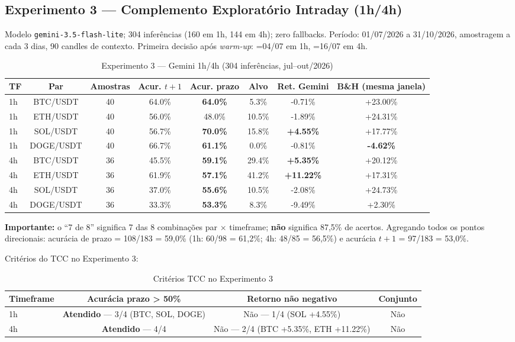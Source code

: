 \documentclass[conference]{IEEEtran}
\begin{document}
\subsection{Experimento 3 — Complemento Exploratório Intraday (1h/4h)}

Modelo \texttt{gemini-3.5-flash-lite}; 304 inferências (160 em 1h, 144 em 4h); zero fallbacks. Período: 01/07/2026 a 31/10/2026, amostragem a cada 3 dias, 90 candles de contexto. Primeira decisão após \textit{warm-up}: =04/07 em 1h, =16/07 em 4h.

\begin{table}[t]
  \centering
  \caption{Experimento 3 — Gemini 1h/4h (304 inferências, jul–out/2026)}
  \label{tab:exp3_intraday}
  \small
  \begin{tabular}{lccccccc}
    \toprule
    TF & Par & Amostras & Acur. $t+1$ & Acur. prazo & Alvo & Ret. Gemini & B\&H (mesma janela) \\
    \midrule
    1h & BTC/USDT & 40 & 64.0\% & \textbf{64.0\%} & 5.3\%  & -0.71\% & +23.00\% \\
    1h & ETH/USDT & 40 & 56.0\% & 48.0\% & 10.5\% & -1.89\% & +24.31\% \\
    1h & SOL/USDT & 40 & 56.7\% & \textbf{70.0\%} & 15.8\% & \textbf{+4.55\%} & +17.77\% \\
    1h & DOGE/USDT& 40 & 66.7\% & \textbf{61.1\%} & 0.0\%  & -0.81\% & \textbf{-4.62\%} \\
    4h & BTC/USDT & 36 & 45.5\% & \textbf{59.1\%} & 29.4\% & \textbf{+5.35\%} & +20.12\% \\
    4h & ETH/USDT & 36 & 61.9\% & \textbf{57.1\%} & 41.2\% & \textbf{+11.22\%} & +17.31\% \\
    4h & SOL/USDT & 36 & 37.0\% & \textbf{55.6\%} & 10.5\% & -2.08\%  & +24.73\% \\
    4h & DOGE/USDT& 36 & 33.3\% & \textbf{53.3\%} & 8.3\%  & -9.49\%  & +2.30\%  \\
    \bottomrule
  \end{tabular}
\end{table}

\textbf{Importante:} o ``7 de 8'' significa 7 das 8 combinações par × timeframe; \textbf{não} significa 87,5\% de acertos. Agregando todos os pontos direcionais: acurácia de prazo = 108/183 = 59,0\% (1h: 60/98 = 61,2\%; 4h: 48/85 = 56,5\%) e acurácia $t+1$ = 97/183 = 53,0\%.

Critérios do TCC no Experimento 3:

\begin{table}[H]
  \centering
  \caption{Critérios TCC no Experimento 3}
  \label{tab:exp3_criterios}
  \small
  \begin{tabular}{lccc}
    \toprule
    Timeframe & Acurácia prazo > 50\% & Retorno não negativo & Conjunto \\
    \midrule
    1h & \textbf{Atendido} — 3/4 (BTC, SOL, DOGE) & Não — 1/4 (SOL +4.55\%) & Não \\
    4h & \textbf{Atendido} — 4/4 & Não — 2/4 (BTC +5.35\%, ETH +11.22\%) & Não \\
    \bottomrule
  \end{tabular}
\end{table}
\end{document}

